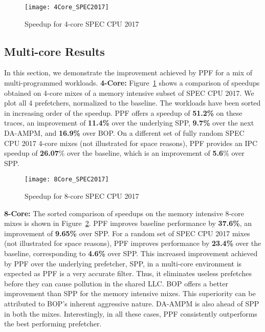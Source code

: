 
\begin{figure}[ht]
\texttt{[image: 4Core\_SPEC2017]}
\caption{Speedup for 4-core SPEC CPU 2017}
\label{Fig:4Core_SPEC2017}
\end{figure}

\subsection{Multi-core Results}
\label{Results-Multi}
\noindent In this section, we demonstrate the improvement achieved by PPF for a
mix of multi-programmed workloads.
\newline
\newline
\noindent \textbf{4-Core:} Figure~\ref{Fig:4Core_SPEC2017}
shows a comparison of speedups obtained on 4-core mixes of a memory
intensive subset of SPEC CPU 2017. We plot all 4 prefetchers, normalized
to the baseline. The workloads have been sorted in increasing order of
the speedup. PPF offers a speedup of \textbf{51.2\%} on these traces,
an improvement of \textbf{11.4\%} over the underlying SPP,
\textbf{9.7\%} over the next DA-AMPM, and \textbf{16.9\%} over BOP.
On a different set of fully random SPEC CPU 2017 4-core mixes (not
illustrated for space reasons), PPF provides an IPC speedup of
\textbf{26.07}\% over the
baseline, which is an improvement of \textbf{5.6}\% over SPP.
%
\begin{figure}[ht]
\texttt{[image: 8Core\_SPEC2017]}
\caption{Speedup for 8-core SPEC CPU 2017}
\label{Fig:8Core_SPEC2017}
\end{figure}
%
\newline
\newline
\noindent \textbf{8-Core:} The sorted comparison of speedups on the
memory intensive 8-core mixes is shown in
Figure~\ref{Fig:8Core_SPEC2017}.  PPF improves baseline performance by
\textbf{37.6\%}, an improvement of \textbf{9.65\%} over SPP. For a
random set of SPEC CPU 2017 mixes (not illustrated for space reasons),
PPF improves performance by \textbf{23.4\%} over the baseline,
corresponding to \textbf{4.6\%} over SPP. This increased improvement
achieved by PPF over the {underlying prefetcher, SPP,} 
in a multi-core environment is expected as PPF is a very accurate filter. 
Thus, it eliminates useless prefetches before they can cause pollution in the 
shared LLC. BOP offers a better improvement than SPP for the memory intensive
mixes. This superiority can be attributed to BOP's inherent aggressive
nature. DA-AMPM is also ahead of SPP in both the mixes. Interestingly,
in all these cases, PPF consistently outperforms the best performing
prefetcher.

